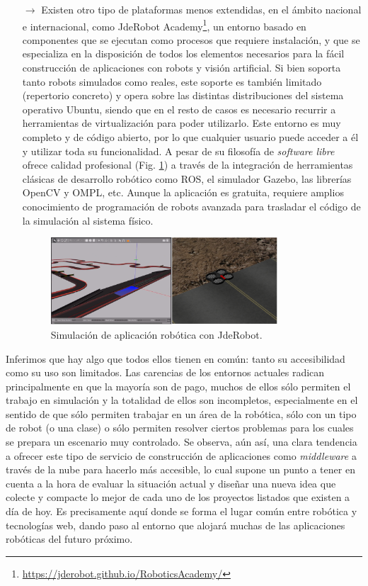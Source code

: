 \begin{itemize}
\item [$\rightarrow$] Existen otro tipo de plataformas menos extendidas, en el ámbito nacional e internacional, como JdeRobot Academy\footnote{\url{https://jderobot.github.io/RoboticsAcademy/}}, un entorno basado en componentes que se ejecutan como procesos que requiere instalación, y que se especializa en la disposición de todos los elementos necesarios para la fácil construcción de aplicaciones con robots y visión artificial. Si bien soporta tanto robots simulados como reales, este soporte es también limitado (repertorio concreto) y opera sobre las distintas distribuciones del sistema operativo Ubuntu, siendo que en el resto de casos es necesario recurrir a herramientas de virtualización para poder utilizarlo. Este entorno es muy completo y de código abierto, por lo que cualquier usuario puede acceder a él y utilizar toda su funcionalidad. A pesar de su filosofía de \textit{software libre} ofrece calidad profesional (Fig. \ref{jderobot}) a través de la integración de herramientas clásicas de desarrollo robótico como ROS, el simulador Gazebo, las librerías OpenCV y OMPL, etc. Aunque la aplicación es gratuita, requiere amplios conocimiento de programación de robots avanzada para trasladar el código de la simulación al sistema físico.

\begin{figure}[!hbtp]  \centering\noindent
    \includegraphics[width=0.8\textwidth]{figures/jderobot_simulation.png}
    \caption{Simulación de aplicación robótica con JdeRobot.}
    \label{jderobot}
\end{figure}

\end{itemize}

Inferimos que hay algo que todos ellos tienen en común: tanto su accesibilidad como su uso son limitados. Las carencias de los entornos actuales radican principalmente en que la mayoría son de pago, muchos de ellos sólo permiten el trabajo en simulación y la totalidad de ellos son incompletos, especialmente en el sentido de que sólo permiten trabajar en un área de la robótica, sólo con un tipo de robot (o una clase) o sólo permiten resolver ciertos problemas para los cuales se prepara un escenario muy controlado. Se observa, aún así, una clara tendencia a ofrecer este tipo de servicio de construcción de aplicaciones como \textit{middleware} a través de la nube para hacerlo más accesible, lo cual supone un punto a tener en cuenta a la hora de evaluar la situación actual y diseñar una nueva idea que colecte y compacte lo mejor de cada uno de los proyectos listados que existen a día de hoy. Es precisamente aquí donde se forma el lugar común entre robótica y tecnologías web, dando paso al entorno que alojará muchas de las aplicaciones robóticas del futuro próximo.

